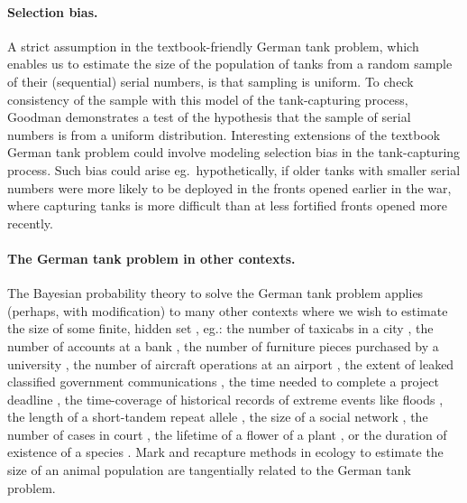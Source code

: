 \documentclass[11pt, oneside]{article}
\begin{document}
\paragraph{Selection bias.}
A strict assumption in the textbook-friendly German tank problem, which enables us to estimate the size of the population of tanks from a random sample of their (sequential) serial numbers, is that sampling is uniform. 
To check consistency of the sample with this model of the tank-capturing process, Goodman \cite{goodman1954some} demonstrates a test of the hypothesis that the sample of serial numbers is from a uniform distribution. 
Interesting extensions of the textbook German tank problem could involve modeling selection bias in the tank-capturing process. 
Such bias could arise eg.\ hypothetically, if older tanks with smaller serial numbers were more likely to be deployed in the fronts opened earlier in the war, where capturing tanks is more difficult than at less fortified fronts opened more recently.


\paragraph{The German tank problem in other contexts.}
The Bayesian probability theory to solve the German tank problem applies (perhaps, with modification) to many other contexts where we wish to estimate the size of some finite, hidden set \cite{cheng2020estimating}, eg.: the number of taxicabs in a city \cite{grajalez2013great}, the number of accounts at a bank \cite{hohle2006bayesian}, the number of furniture pieces purchased by a university \cite{goodman1954some}, the number of aircraft operations at an airport \cite{mott2016estimation}, the extent of leaked classified government communications \cite{gill2015estimating}, the time needed to complete a project deadline \cite{fehlmann2017new}, the time-coverage of historical records of extreme events like floods \cite{prosdocimi2018german}, 
 the length of a short-tandem repeat allele \cite{tang2017profiling}, the size of a social network \cite{katzir2011estimating}, the number of cases in court \cite{wu2022augmenting}, the lifetime of a flower of a plant \cite{pearse2017statistical}, or the duration of existence of a species \cite{roberts2003did}.
Mark and recapture methods in ecology to estimate the size of an animal population \cite{nichols1992capture,chao2001overview} are tangentially related to the German tank problem.
\end{document}
